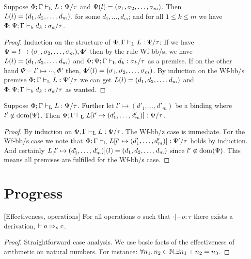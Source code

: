 \documentclass[a4paper, oneside, 10pt, draft]{memoir}
\begin{document}
\begin{lem}
  \label{lem:tpbb-lookup}
  Suppose $\Phi;\Gamma |-_{\mathrm{L}} L : \Psi / \tau$ and $\Psi(l) =
  (\sigma_1, \sigma_2, \dotsc, \sigma_m)$. Then $L(l) = (d_1, d_2, \dotsc, d_m)$, for some $d_1, \dotsc, d_m$; and
  for all $1 \leq k \leq m$ we have $\Phi;\Psi;\Gamma
  |-_{\mathrm{b}} d_k : \sigma_k / \tau$.
\end{lem}
\begin{proof}
  Induction on the structure of $\Phi;\Gamma |-_{\mathrm{L}} L : \Psi / \tau$:
  If we have $\Psi = l \mapsto (\sigma_1, \sigma_2, \dotsc, \sigma_m), \Phi'$ then by the rule Wf-bb/s, we
  have $L(l) = (d_1, d_2, \dotsc, d_m)$ and $\Phi;\Psi;\Gamma |-_{\mathrm{b}} d_k : \sigma_k /
  \tau$ as a premise. If on the other hand $\Psi = l'
  \mapsto \dotsb, \Phi'$ then, $\Phi'(l) = (\sigma_1, \sigma_2, \dotsc, \sigma_m)$. By induction on
  the Wf-bb/s premise $\Phi;\Gamma |-_{\mathrm{L}} L : \Psi' / \tau$ we can get $L(l) =
  (d_1, d_2, \dotsc, d_m)$ and $\Phi;\Psi;\Gamma |-_{\mathrm{b}} d_k : \sigma_k / \tau$ as wanted.
\end{proof}

\newcommand{\dbundlep}{(d'_1, \dotsc, d'_m)}
\begin{lem}
  \label{lem:tpbb-weaken-l}
  Suppose $\Phi;\Gamma |-_{\mathrm{L}} L : \Psi / \tau$. Further let $l' \mapsto
  \dbundlep$ be a binding where $l' \not \in \mathrm{dom}(\Psi)$. Then
  $\Phi;\Gamma \tpbb L[l' \mapsto \dbundlep] : \Psi / \tau$.
\end{lem}
\begin{proof}
  By induction on $\Phi;\Gamma |-_{\mathrm{L}} L : \Psi / \tau$. The Wf-bb/z
  case is immediate. For the Wf-bb/s case we note that $\Phi;\Gamma
  \tpbb L[l' \mapsto \dbundlep] : \Psi' / \tau$ holds by
  induction. And certainly $L[l' \mapsto \dbundlep](l) = \dbundle$
  since $l' \not \in \mathrm{dom}(\Psi)$. This means all premises are
  fulfilled for the Wf-bb/s case.
\end{proof}
\section{Progress}

\begin{lem}{[Effectiveness, operations]}
  \label{lem:can-step-op}
  For all operations $o$ such that $\cdot |- o : \tau$ there exists a
  derivation, $|- o =>_{o} c$.
\end{lem}
\begin{proof}
  Straightforward case analysis. We use basic facts of the
  effectiveness of arithmetic on natural numbers. For instance:
  $\forall n_1, n_2 \in \mathbb{N} . \exists n_1 + n_2 = n_3$.
\end{proof}
\end{document}
